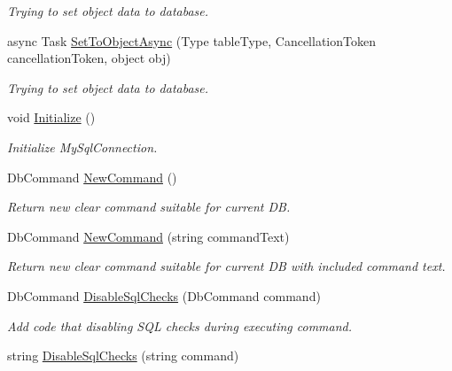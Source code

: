 \begin{DoxyCompactItemize}
\begin{DoxyCompactList}\small\item\em Trying to set object data to database. \end{DoxyCompactList}\item 
async Task \mbox{\hyperlink{class_uniform_data_operator_1_1_sql_1_1_my_sql_1_1_my_sql_data_operator_a3be9aeb9ce11e3fd536449843a585490}{Set\+To\+Object\+Async}} (Type table\+Type, Cancellation\+Token cancellation\+Token, object obj)
\begin{DoxyCompactList}\small\item\em Trying to set object data to database. \end{DoxyCompactList}\item 
void \mbox{\hyperlink{class_uniform_data_operator_1_1_sql_1_1_my_sql_1_1_my_sql_data_operator_a5aad834d2ceba598037b6ed19b27db6d}{Initialize}} ()
\begin{DoxyCompactList}\small\item\em Initialize My\+Sql\+Connection. \end{DoxyCompactList}\item 
Db\+Command \mbox{\hyperlink{class_uniform_data_operator_1_1_sql_1_1_my_sql_1_1_my_sql_data_operator_af5850bfb38f7dfcd5acd5157458ef4bd}{New\+Command}} ()
\begin{DoxyCompactList}\small\item\em Return new clear command suitable for current DB. \end{DoxyCompactList}\item 
Db\+Command \mbox{\hyperlink{class_uniform_data_operator_1_1_sql_1_1_my_sql_1_1_my_sql_data_operator_a6c2e2d374072c275953a515379963881}{New\+Command}} (string command\+Text)
\begin{DoxyCompactList}\small\item\em Return new clear command suitable for current DB with included command text. \end{DoxyCompactList}\item 
Db\+Command \mbox{\hyperlink{class_uniform_data_operator_1_1_sql_1_1_my_sql_1_1_my_sql_data_operator_affbacb4fb1773fc14cdbb9cbcd315c5f}{Disable\+Sql\+Checks}} (Db\+Command command)
\begin{DoxyCompactList}\small\item\em Add code that disabling S\+QL checks during executing command. \end{DoxyCompactList}\item 
string \mbox{\hyperlink{class_uniform_data_operator_1_1_sql_1_1_my_sql_1_1_my_sql_data_operator_a3e80f9136c9fef46a443901a15f1e289}{Disable\+Sql\+Checks}} (string command)

\end{DoxyCompactItemize}
